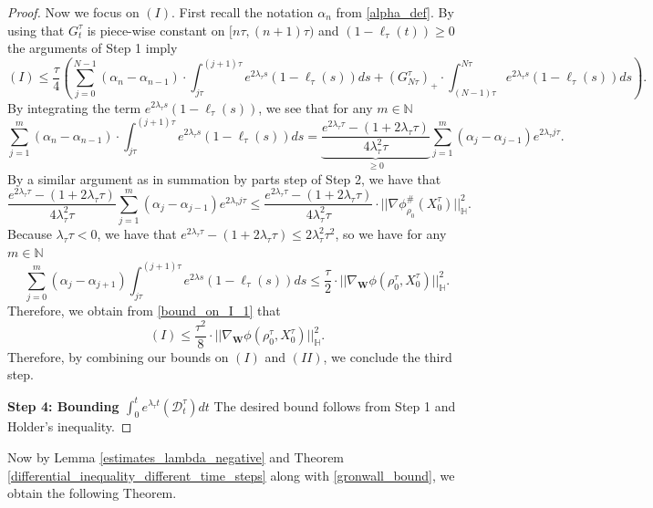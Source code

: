 \documentclass[11pt,a4paper]{amsart}
\newcommand{\1}{\mathds{1}}
\newcommand{\N}{\mathbb{N}}
\numberwithin{equation}{section}
\begin{document}
\begin{proof}
Now we focus on $(I)$. First recall the notation $\alpha_n$ from \eqref{alpha_def}. By using that $G^{\tau}_{t}$ is piece-wise constant on $[n\tau,(n+1)\tau)$ and $(1-\ell_{\tau}(t)) \geq 0$ the arguments of Step 1 imply
\begin{equation}
(I) \leq \frac{\tau}{4} \left( \sum_{j=0}^{N-1} (\alpha_n-\alpha_{n-1}) \cdot \int_{j \tau}^{(j+1)\tau}  e^{2 \lambda_{\tau} s} (1-\ell_{\tau}(s)) ds + (G^{\tau}_{N \tau})_{+} \cdot \int_{(N-1)\tau}^{N \tau} e^{2 \lambda_{\tau} s} (1-\ell_{\tau}(s)) ds    \right). \label{bound_on_I_1}
\end{equation} By integrating the term $e^{2 \lambda_{\tau} s} (1-\ell_{\tau}(s))$, we see that for any $m \in \N$
\[ \sum_{j=1}^{m} (\alpha_n-\alpha_{n-1}) \cdot \int_{j \tau}^{(j+1)\tau}  e^{2 \lambda_{\tau} s} (1-\ell_{\tau}(s)) ds = 
\underbrace{\frac{ e^{2 \lambda_{\tau} \tau} - (1+2\lambda_{\tau} \tau)  }{4 \lambda_{\tau}^2 \tau}}_{\geq 0} \sum_{j=1}^{m} (\alpha_j-\alpha_{j-1}) e^{2 \lambda_{\tau} j \tau}.  \] By a similar argument as in summation by parts step of Step 2, we have that
\[ \frac{ e^{2 \lambda_{\tau} \tau} - (1+2\lambda_{\tau} \tau)  }{4 \lambda_{\tau}^2 \tau} \sum_{j=1}^{m} (\alpha_j-\alpha_{j-1}) e^{2 \lambda_{\tau} j \tau} \leq \frac{ e^{2 \lambda_{\tau} \tau} - (1+2\lambda_{\tau} \tau)  }{4 \lambda_{\tau}^2 \tau}  \cdot ||\nabla \phi^{\#}_{\rho_0}(X_0^{\tau})||^2_{\mathbb{H}}.  \]
Because $\lambda_{\tau} \tau < 0$, we have that $e^{2\lambda_{\tau} \tau} - (1+2\lambda_{\tau}  \tau) \leq 2\lambda_{\tau}^2 \tau^2$, so we have for any $m \in \N$
\[
\sum_{j=0}^{m} (\alpha_j-\alpha_{j+1}) \int_{j \tau}^{(j+1)\tau} e^{2 \lambda s} (1-\ell_{\tau}(s)) ds \leq \frac{\tau}{2} \cdot ||\nabla_{\mathbf{W}} \phi(\rho^{\tau}_0,X^{\tau}_0)||^2_{\mathbb{H}}.
\]  Therefore, we obtain from \eqref{bound_on_I_1} that
\[ (I) \leq \frac{\tau^2}{8} \cdot ||\nabla_{\mathbf{W}} \phi(\rho^{\tau}_0,X^{\tau}_0)||^2_{\mathbb{H}} .  \] Therefore, by combining our bounds on $(I)$ and $(II)$, we conclude the third step. \smallskip

\noindent \textbf{Step 4: Bounding $\int_0^t e^{\lambda_{\tau} t} (\mathcal{D}_t^{\tau}) dt$}
The desired bound follows from Step 1 and Holder's inequality.\end{proof}
 Now by Lemma \ref{estimates_lambda_negative} and Theorem \ref{differential_inequality_different_time_steps} along with \eqref{gronwall_bound}, we obtain the following Theorem.
\end{document}
